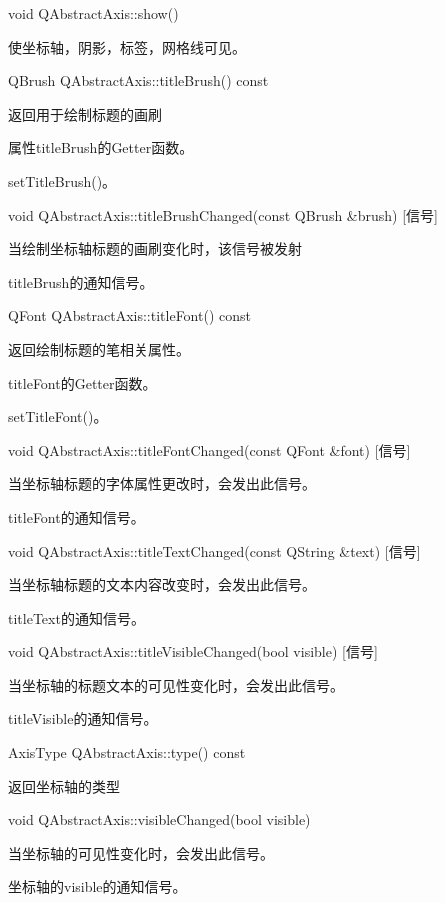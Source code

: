 void QAbstractAxis::show() 

使坐标轴，阴影，标签，网格线可见。

QBrush QAbstractAxis::titleBrush() const 

返回用于绘制标题的画刷

\begin{notice}
属性titleBrush的Getter函数。
\end{notice}

\begin{notice}[另请参阅]
setTitleBrush()。
\end{notice}

void QAbstractAxis::titleBrushChanged(const QBrush \&brush) [信号] 

当绘制坐标轴标题的画刷变化时，该信号被发射 

\begin{notice}
titleBrush的通知信号。
\end{notice}

QFont QAbstractAxis::titleFont() const 

返回绘制标题的笔相关属性。 

\begin{notice}
titleFont的Getter函数。
\end{notice}

\begin{notice}[另请参阅]
setTitleFont()。
\end{notice}

void QAbstractAxis::titleFontChanged(const QFont \&font) [信号]

当坐标轴标题的字体属性更改时，会发出此信号。 

\begin{notice}
titleFont的通知信号。
\end{notice}

void QAbstractAxis::titleTextChanged(const QString \&text) [信号] 

当坐标轴标题的文本内容改变时，会发出此信号。 

\begin{notice}
titleText的通知信号。
\end{notice}

void QAbstractAxis::titleVisibleChanged(bool visible) [信号] 

当坐标轴的标题文本的可见性变化时，会发出此信号。 

\begin{notice}
titleVisible的通知信号。
\end{notice}

AxisType QAbstractAxis::type() const 

返回坐标轴的类型

void QAbstractAxis::visibleChanged(bool visible) 

当坐标轴的可见性变化时，会发出此信号。 

\begin{notice}
坐标轴的visible的通知信号。
\end{notice}